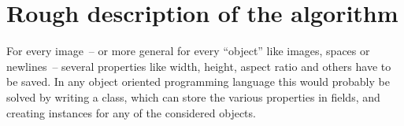 \documentclass[version=3.12,american]{scrartcl}
\begin{document}
\section{Rough description of the algorithm}
For every image~-- or more general for every ``object'' like  images, spaces or newlines~-- several properties like width, height, aspect ratio and others have to be saved. In any object oriented programming language this would probably be solved by writing a class, which can store the various properties in fields, and creating instances for any of the considered objects.
\end{document}
